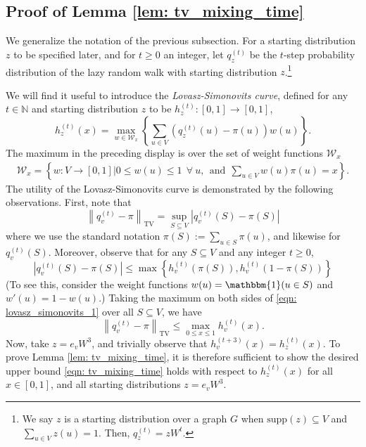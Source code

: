 \documentclass[11pt,twoside]{article}
\theoremstyle{definition}
\newcommand{\set}[1]{\left\{#1\right\}}
\newcommand{\abs}[1]{\left \lvert #1 \right \rvert}
\newcommand{\norm}[1]{\left\lVert#1\right\rVert}
\newcommand{\1}{\mathbbm{1}}
\begin{document}
\subsection{Proof of Lemma \ref{lem: tv_mixing_time}}
\label{sec: mixing_time_on_graphs}

We generalize the notation of the previous subsection. For a starting distribution $z$ to be specified later, and for $t \geq 0$ an integer, let $q_z^{(t)}$ be the $t$-step probability distribution of the lazy random walk with starting distribution $z$.\footnote{We say $z$ is a starting distribution over a graph $G$ when $\textrm{supp}(z) \subseteq V$ and $\sum_{u \in V}z(u) = 1$. Then, $q_z^{(t)} = zW^t$.}

We will find it useful to introduce the \emph{Lovasz-Simonovits curve}, defined for any $t \in \mathbb{N}$ and starting distribution $z$ to be $h_z^{(t)}: [0,1] \to [0,1]$,
\begin{equation*}
h_z^{(t)}(x) = \max_{w \in \mathcal{W}_x} \left\{ \sum_{u \in V} \left(q_z^{(t)}(u) - \pi(u)\right)w(u)\right\}.
\end{equation*}
The maximum in the preceding display is over the set of weight functions $\mathcal{W}_{x}$
\begin{align*}
\mathcal{W}_x = \left\{w: V \to [0,1] \Big\vert 0 \leq w(u) \leq 1~~\forall~u,~~\text{and}~~\sum_{u \in V} w(u) \pi(u) = x\right\}.
\end{align*}
The utility of the Lovasz-Simonovits curve is demonstrated by the following observations. First, note that
\begin{equation*}
\norm{q_v^{(t)} - \pi}_{\mathrm{TV}} = \sup_{S \subseteq V} \abs{q_v^{(t)}(S) - \pi(S)}
\end{equation*}
where we use the standard notation $\pi(S) := \sum_{u \in S} \pi(u)$, and likewise for $q_v^{(t)}(S)$. Moreover, observe that for any $S \subseteq V$ and any integer $t \geq 0$,
\begin{equation}
\label{eqn: lovasz_simonovits_1}
\abs{q_v^{(t)}(S) - \pi(S)} \leq \max \set{h_v^{(t)}(\pi(S)), h_v^{(t)}(1 - \pi(S))}
\end{equation}
(To see this, consider the weight functions $w(u) = \1(u \in S)$ and $w'(u) = 1 - w(u)$.) Taking the maximum on both sides of \eqref{eqn: lovasz_simonovits_1}  over all $S \subseteq V$, we have
\begin{equation*}
\norm{q_v^{(t)} - \pi}_{\mathrm{TV}} \leq \max_{0 \leq x \leq 1} h_v^{(t)}(x).
\end{equation*}
Now, take $z = e_vW^3$, and trivially observe that $h_v^{(t+3)}(x) = h_z^{(t)}(x)$. To prove Lemma \ref{lem: tv_mixing_time}, it is therefore sufficient to show the desired upper bound \eqref{eqn: tv_mixing_time} holds with respect to $h_z^{(t)}(x)$ for all $x \in [0,1]$, and all starting distributions $z = e_vW^3$. 
\end{document}
